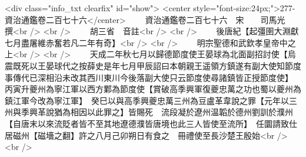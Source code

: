 <div class="info_txt clearfix" id="show">
<center style="font-size:24px;">277-資治通鑑卷二百七十六</center>
  　　資治通鑑卷二百七十六　宋　　司馬光　撰<br />
<br />
　　胡三省　音註<br />
<br />
　　後唐紀【起彊圉大淵獻七月盡屠維赤奮若凡二年有奇】<br />
<br />
　　明宗聖德和武欽孝皇帝中之上<br />
<br />
　　天成二年秋七月以歸德節度使王晏球為北面副招討使【烏震既死以王晏球代之按薛史是年七月甲辰詔曰本朝親王遥領方鎮遂有副大使知節度事傳代已深相沿未改其西川東川今後落副大使只云節度使尋諸鎮皆正授節度使】　丙寅升夔州為寧江軍以西方鄴為節度使【賞破高季興軍復夔忠萬之功也蜀以夔州為鎮江軍今改為寧江軍】　癸巳以與高季興夔忠萬三州為豆盧革韋說之罪【元年以三州與季興革說猶為相因以此罪之】皆賜死　流段凝於遼州温韜於德州劉訓於濮州【自唐末以來流貶者皆不至其地遼德濮皆唐境也此三人皆使至流所】　任圜請致仕居磁州【磁墻之翻】許之八月己卯朔日有食之　冊禮使至長沙楚王殷始<br />
<br />
